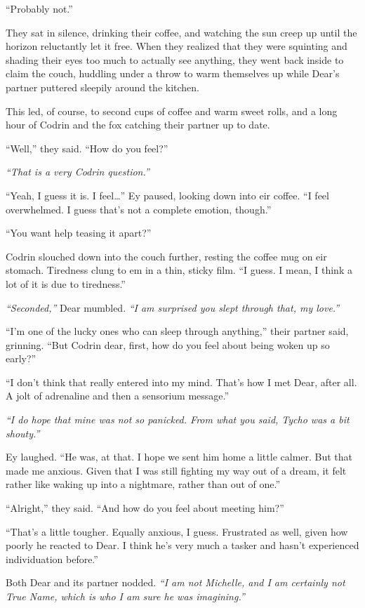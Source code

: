 ``Probably not.''

They sat in silence, drinking their coffee, and watching the sun creep up until the horizon reluctantly let it free. When they realized that they were squinting and shading their eyes too much to actually see anything, they went back inside to claim the couch, huddling under a throw to warm themselves up while Dear's partner puttered sleepily around the kitchen.

This led, of course, to second cups of coffee and warm sweet rolls, and a long hour of Codrin and the fox catching their partner up to date.

``Well,'' they said. ``How do you feel?''

\emph{``That is a very Codrin question.''}

``Yeah, I guess it is. I feel\ldots{}'' Ey paused, looking down into eir coffee. ``I feel overwhelmed. I guess that's not a complete emotion, though.''

``You want help teasing it apart?''

Codrin slouched down into the couch further, resting the coffee mug on eir stomach. Tiredness clung to em in a thin, sticky film. ``I guess. I mean, I think a lot of it is due to tiredness.''

\emph{``Seconded,''} Dear mumbled. \emph{``I am surprised you slept through that, my love.''}

``I'm one of the lucky ones who can sleep through anything,'' their partner said, grinning. ``But Codrin dear, first, how do you feel about being woken up so early?''

``I don't think that really entered into my mind. That's how I met Dear, after all. A jolt of adrenaline and then a sensorium message.''

\emph{``I do hope that mine was not so panicked. From what you said, Tycho was a bit shouty.''}

Ey laughed. ``He was, at that. I hope we sent him home a little calmer. But that made me anxious. Given that I was still fighting my way out of a dream, it felt rather like waking up into a nightmare, rather than out of one.''

``Alright,'' they said. ``And how do you feel about meeting him?''

``That's a little tougher. Equally anxious, I guess. Frustrated as well, given how poorly he reacted to Dear. I think he's very much a tasker and hasn't experienced individuation before.''

Both Dear and its partner nodded. \emph{``I am not Michelle, and I am certainly not True Name, which is who I am sure he was imagining.''}

